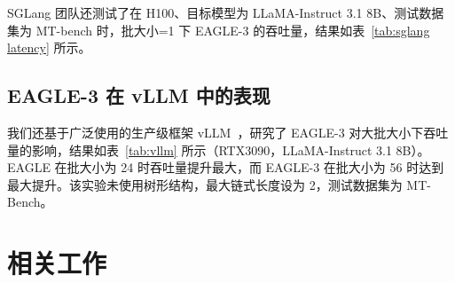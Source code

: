 \documentclass[11pt]{article}
\begin{document}
SGLang 团队还测试了在 H100、目标模型为 LLaMA-Instruct 3.1 8B、测试数据集为 MT-bench 时，批大小=1 下 EAGLE-3 的吞吐量，结果如表~\ref{tab:sglang latency} 所示。

\begin{table}[h]
  \centering
  \caption{在 H100、目标模型为 LLaMA-Instruct 3.1 8B、测试数据集为 MT-bench 时批大小=1 下的吞吐量。实验由 SGLang 团队进行。}
  \label{tab:sglang latency}%
\end{table}%

\subsection{EAGLE-3 在 vLLM 中的表现}

我们还基于广泛使用的生产级框架 vLLM~\cite{kwon2023efficient}，研究了 EAGLE-3 对大批大小下吞吐量的影响，结果如表~\ref{tab:vllm} 所示（RTX3090，LLaMA-Instruct 3.1 8B）。EAGLE 在批大小为 24 时吞吐量提升最大，而 EAGLE-3 在批大小为 56 时达到最大提升。该实验未使用树形结构，最大链式长度设为 2，测试数据集为 MT-Bench。

\begin{table}[h]
  \centering
  \caption{在 A100 和 LLaMA-Instruct 3.1 8B 上 MT-Bench 数据集不同批大小下的吞吐量提升，以不使用推测性采样的 vLLM 为基线（1.00x）。}
  \label{tab:vllm}%
\end{table}%

\section{相关工作}
\end{document}
